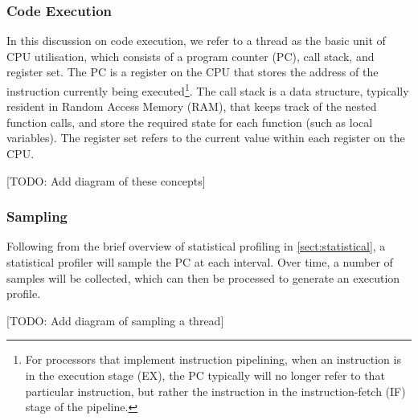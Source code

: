 \subsubsection{Code Execution}

In this discussion on code execution, we refer to a thread as the basic unit of CPU utilisation, which consists of a program counter (PC), call stack, and register set. The PC is a register on the CPU that stores the address of the instruction currently being executed\footnote{For processors that implement instruction pipelining, when an instruction is in the execution stage (EX), the PC typically will no longer refer to that particular instruction, but rather the instruction in the instruction-fetch (IF) stage of the pipeline.}. The call stack is a data structure, typically resident in Random Access Memory (RAM), that keeps track of the nested function calls, and store the required state for each function (such as local variables). The register set refers to the current value within each register on the CPU. 


[TODO: Add diagram of these concepts]

\subsubsection{Sampling}

Following from the brief overview of statistical profiling in \ref{sect:statistical}, a statistical profiler will sample the PC at each interval. Over time, a number of samples will be collected, which can then be processed to generate an execution profile. 

[TODO: Add diagram of sampling a thread]


